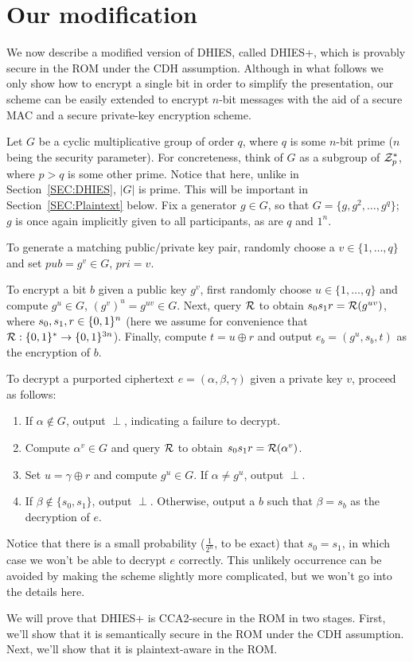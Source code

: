 \section{Our modification}
\label{SEC:Ourscheme}
We now describe a modified version of DHIES, called DHIES+, which is provably
secure in the ROM under the CDH assumption. Although in what follows we only
show how to encrypt a single bit in order to simplify the presentation, our
scheme can be easily extended to encrypt $n$-bit messages with the aid of a
secure MAC and a secure private-key encryption scheme.

Let $G$ be a cyclic multiplicative group of order $q$, where $q$ is some
$n$-bit prime ($n$ being the security parameter). For concreteness, think of
$G$ as a subgroup of $\mathcal{Z}_p^*$, where $p > q$ is some other prime. Notice
that here, unlike in Section~\ref{SEC:DHIES}, $|G|$ is prime. This will be
important in Section~\ref{SEC:Plaintext} below. Fix a generator $g \in G$, so
that $G = \{g, g^2, \ldots, g^q\}$; $g$ is once again implicitly given to all
participants, as are $q$ and $1^n$.

To generate a matching public/private key pair, randomly choose a $v \in
\{1,\ldots,q\}$ and set $pub = g^v \in G$, $pri = v$. 

To encrypt a bit $b$ given a public key $g^v$, first randomly choose $u \in
\{1,\ldots,q\}$ and compute $g^u \in G$, $(g^v)^u = g^{uv} \in G$. Next,
query $\mathcal{R}$ to obtain $s_0s_1r = \mathcal{R}(g^{uv})$, where $s_0,s_1,r \in
\{0,1\}^{n}$ (here we assume for convenience that $\mathcal{R}: \{0,1\}^{*} \to
\{0,1\}^{3n}$).  Finally, compute $t = u \oplus r$ and output $e_b = (g^u, s_b,
t)$ as the encryption of $b$. 

To decrypt a purported ciphertext $e = (\alpha,\beta,\gamma)$ given a private
key $v$, proceed as follows:
\begin{enumerate}
\item If $\alpha \notin G$, output $\perp$, indicating
a failure to decrypt. 
\item Compute $\alpha^v \in G$ and query $\mathcal{R}$ to
obtain $s_0s_1r = \mathcal{R}(\alpha^v)$.
\item Set $u = \gamma \oplus r$ and compute $g^u \in G$.  If
$\alpha \neq g^u$, output $\perp$. 
\item If $\beta \notin \{s_0,s_1\}$, output
$\perp$. Otherwise, output a $b$ such that $\beta = s_b$ as the decryption of
$e$. 
\end{enumerate}
\begin{rem}
Notice that there is a small probability ($\frac{1}{2^n}$,
to be exact) that $s_0 = s_1$, in which case we won't be able to decrypt $e$
correctly. This unlikely occurrence can be avoided by making the scheme
slightly more complicated, but we won't go into the details here.
\end{rem}
We will prove that DHIES+ is CCA2-secure in the ROM in two stages. First,
we'll show that it is semantically secure in the ROM under the CDH
assumption. Next, we'll show that it is plaintext-aware in the ROM.

